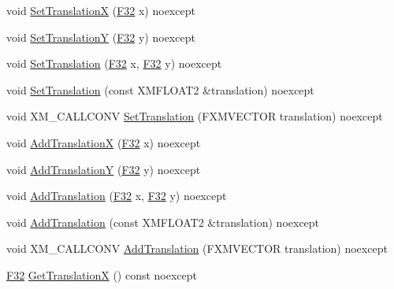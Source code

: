 \begin{DoxyCompactItemize}
\item 
void \hyperlink{classmage_1_1_sprite_transform_aa30ede51f36c31b5a35ebe7b60545e1c}{Set\+TranslationX} (\hyperlink{namespacemage_aa97e833b45f06d60a0a9c4fc22ae02c0}{F32} x) noexcept
\item 
void \hyperlink{classmage_1_1_sprite_transform_a3086df30d1ed6813db07bc78ef47df6c}{Set\+TranslationY} (\hyperlink{namespacemage_aa97e833b45f06d60a0a9c4fc22ae02c0}{F32} y) noexcept
\item 
void \hyperlink{classmage_1_1_sprite_transform_a9fb2d4e0f332c316c8f2d07f482f40a5}{Set\+Translation} (\hyperlink{namespacemage_aa97e833b45f06d60a0a9c4fc22ae02c0}{F32} x, \hyperlink{namespacemage_aa97e833b45f06d60a0a9c4fc22ae02c0}{F32} y) noexcept
\item 
void \hyperlink{classmage_1_1_sprite_transform_ad5429c09032b52459ac1840ad07290f4}{Set\+Translation} (const X\+M\+F\+L\+O\+A\+T2 \&translation) noexcept
\item 
void X\+M\+\_\+\+C\+A\+L\+L\+C\+O\+NV \hyperlink{classmage_1_1_sprite_transform_a597ef325d25183a969915be48d0a99f7}{Set\+Translation} (F\+X\+M\+V\+E\+C\+T\+OR translation) noexcept
\item 
void \hyperlink{classmage_1_1_sprite_transform_a040bd05b911dbe199c3eab6f6811ce5b}{Add\+TranslationX} (\hyperlink{namespacemage_aa97e833b45f06d60a0a9c4fc22ae02c0}{F32} x) noexcept
\item 
void \hyperlink{classmage_1_1_sprite_transform_ab45b391a7bdc357facd0eb322e0a294f}{Add\+TranslationY} (\hyperlink{namespacemage_aa97e833b45f06d60a0a9c4fc22ae02c0}{F32} y) noexcept
\item 
void \hyperlink{classmage_1_1_sprite_transform_a567a3bd6476151f65d8ca62f818bba45}{Add\+Translation} (\hyperlink{namespacemage_aa97e833b45f06d60a0a9c4fc22ae02c0}{F32} x, \hyperlink{namespacemage_aa97e833b45f06d60a0a9c4fc22ae02c0}{F32} y) noexcept
\item 
void \hyperlink{classmage_1_1_sprite_transform_a257e6a9e0d7762963813c00c8ba2517c}{Add\+Translation} (const X\+M\+F\+L\+O\+A\+T2 \&translation) noexcept
\item 
void X\+M\+\_\+\+C\+A\+L\+L\+C\+O\+NV \hyperlink{classmage_1_1_sprite_transform_a38ce964e75aca33eac312a995d142495}{Add\+Translation} (F\+X\+M\+V\+E\+C\+T\+OR translation) noexcept
\item 
\hyperlink{namespacemage_aa97e833b45f06d60a0a9c4fc22ae02c0}{F32} \hyperlink{classmage_1_1_sprite_transform_a27f93a491eed09c33f1ac547df011867}{Get\+TranslationX} () const noexcept
\item 

\end{DoxyCompactItemize}
